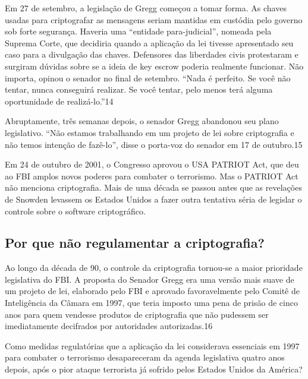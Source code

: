\documentclass{book}
\begin{document}
Em 27 de setembro, a legislação de Gregg começou a tomar forma. As chaves usadas para criptografar as mensagens seriam mantidas em custódia pelo governo sob forte segurança. Haveria uma ``entidade para-judicial'', nomeada pela Suprema Corte, que decidiria quando a aplicação da lei tivesse apresentado seu caso para a divulgação das chaves. Defensores das liberdades civis protestaram e surgiram dúvidas sobre se a ideia de key escrow poderia realmente funcionar. Não importa, opinou o senador no final de setembro. ``Nada é perfeito. Se você não tentar, nunca conseguirá realizar. Se você tentar, pelo menos terá alguma oportunidade de realizá-lo.''14

Abruptamente, três semanas depois, o senador Gregg abandonou seu plano legislativo. ``Não estamos trabalhando em um projeto de lei sobre criptografia e não temos intenção de fazê-lo'', disse o porta-voz do senador em 17 de outubro.15

Em 24 de outubro de 2001, o Congresso aprovou o USA PATRIOT Act, que deu ao FBI amplos novos poderes para combater o terrorismo. Mas o PATRIOT Act não menciona criptografia. Mais de uma década se passou antes que as revelações de Snowden levassem os Estados Unidos a fazer outra tentativa séria de legislar o controle sobre o software criptográfico.


\subsection{Por que não regulamentar a criptografia?}
\label{segredos:regulamentar}

Ao longo da década de 90, o controle da criptografia tornou-se a maior prioridade legislativa do FBI. A proposta do Senador Gregg era uma versão mais suave de um projeto de lei, elaborado pelo FBI e aprovado favoravelmente pelo Comitê de Inteligência da Câmara em 1997, que teria imposto uma pena de prisão de cinco anos para quem vendesse produtos de criptografia que não pudessem ser imediatamente decifrados por autoridades autorizadas.16

Como medidas regulatórias que a aplicação da lei considerava essenciais em 1997 para combater o terrorismo desapareceram da agenda legislativa quatro anos depois, após o pior ataque terrorista já sofrido pelos Estados Unidos da América?
\end{document}

